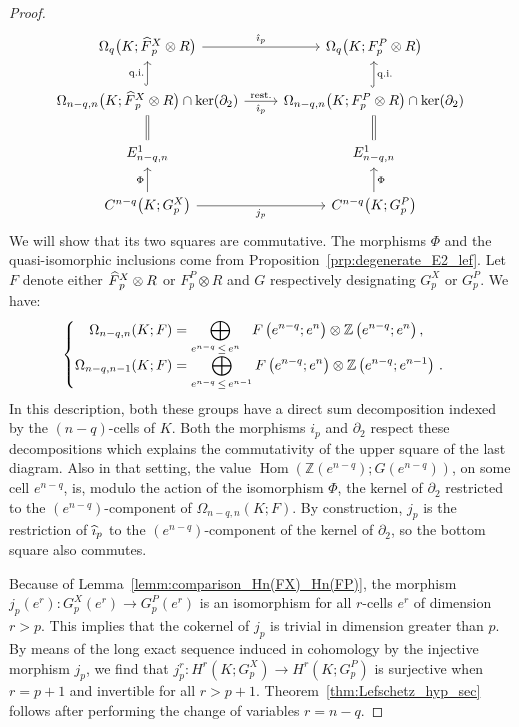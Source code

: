 \documentclass[AHL,Unicode,longabstracts,published]{cedram}
\makeatletter
\newcommand{\Z}{\mathbb{Z}}
\DeclareMathOperator{\Hom}{Hom}
\newcommand{\Fbar}{\hat{F}}
\newcommand{\ibar}{\hat{\imath}}
\newenvironment{alcases}{\left\{\begingroup\arraycolsep=0pt\renewcommand{\arraystretch}{1.2}\begin{array}{r@{\;}l@{\quad}l}}{\end{array}\endgroup\right.}
\let\oldhat\hat
\renewcommand*{\hat}[1]{\mathchoice{\widehat{#1}}{\widehat{#1}}{\oldhat{#1}}{\oldhat{#1}}}
\makeatother
\begin{document}
\begin{proof}
\begin{equation*}
\begin{tikzcd}
\Omega_q\big(K;\Fbar^{X}_p\otimes R\big) \ar[r,"\ibar_p"] & \Omega_{q}\big(K;F^{P}_p\otimes R\big) \\%
\Omega_{n-q,n}\big(K;\Fbar^{X}_p\otimes R\big)\cap\ker(\partial_2) \arrow[u,hook,"\text{q.i.}" left] \ar[r,"\text{rest.}" above,"\ibar_p" below] & \Omega_{n-q,n}\big(K;F^{P}_p\otimes R\big)\cap\ker(\partial_2) \arrow[u,hook,"\text{q.i.}" right] \\%
E^1_{n-q,n} \arrow[u,equal] & E^1_{n-q,n} \arrow[u,equal] \\%
C^{n-q}\big(K;G^{X}_p\big) \ar[u,"\Phi" left] \ar[r,"j_p" below] & C^{n-q}\big(K;G^{P}_p\big) \ar[u,"\Phi" right]
\end{tikzcd}
\end{equation*}
We will show that its two squares are commutative. The morphisms $\Phi$ and the quasi-isomorphic inclusions come from Proposition~\ref{prp:degenerate_E2_lef}. Let $F$ denote either $\Fbar_p^{X}\otimes R$ or $F_p^{P} \otimes R$ and $G$ respectively designating $G_p^{X}$ or $G_p^{P}$. We have:
\begin{equation*}
\begin{alcases}
\Omega_{n-q,n}(K;F)& =\displaystyle\bigoplus_{e^{n-q}\,\leq\,e^{n~~}}F\left(e^{n-q};e^{n}\right)\otimes\Z\left(e^{n-q};e^{n}\right),\\%
\Omega_{n-q,n-1}(K;F)& =\displaystyle\bigoplus_{e^{n-q}\,\leq\,e^{n-1}}F\left(e^{n-q};e^{n}\right)\otimes\Z\left(e^{n-q};e^{n-1}\right)\,.
\end{alcases}
\end{equation*}
In this description, both these groups have a direct sum decomposition indexed by the $(n-q)$-cells of $K$. Both the morphisms $i_p$ and $\partial_2$ respect these decompositions which explains the commutativity of the upper square of the last diagram. Also in that setting, the value $\Hom(\Z(e^{n-q});G(e^{n-q}))$, on some cell $e^{n-q}$, is, modulo the action of the isomorphism $\Phi$, the kernel of $\partial_2$ restricted to the $(e^{n-q})$-component of $\Omega_{n-q,n}(K;F)$. By construction, $j_p$ is the restriction of $\ibar_p$ to the $(e^{n-q})$-component of the kernel of $\partial_2$, so the bottom square also commutes.


Because of Lemma~\ref{lemm:comparison_Hn(FX)_Hn(FP)}, the morphism $j_p(e^r)\colon G_p^{X}(e^{r})\rightarrow G_p^{P}(e^{r})$ is an isomorphism for all $r$-cells $e^{r}$ of dimension $r>p$. This implies that the cokernel of $j_p$ is trivial in dimension greater than $p$. By means of the long exact sequence induced in cohomology by the injective morphism $j_p$, we find that ${j_p^r\colon H^r(K;G^{X}_p)\rightarrow H^r(K;G^{P}_p)}$ is surjective when $r=p+1$ and invertible for all $r>p+1$. Theorem~\ref{thm:Lefschetz_hyp_sec} follows after performing the change of variables $r=n-q$.
\end{proof}
\end{document}
